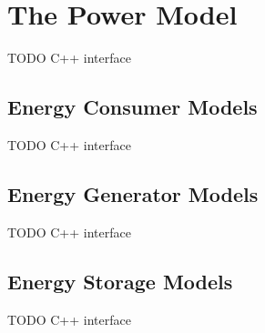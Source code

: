 \chapter{The Power Model}
\label{cha:power}

TODO C++ interface

\section{Energy Consumer Models}

TODO C++ interface
 
\section{Energy Generator Models}

TODO C++ interface

\section{Energy Storage Models}

TODO C++ interface


